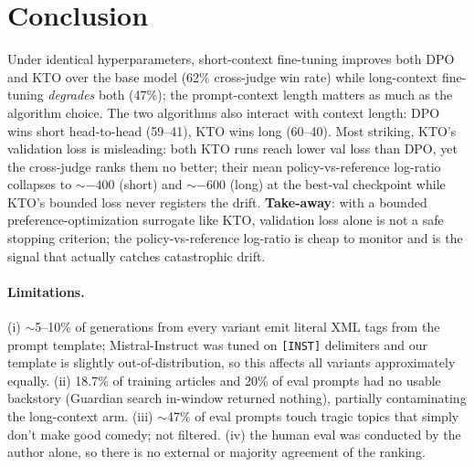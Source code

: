 \section{Conclusion}
\label{sec:conclusion}

\enlargethispage{4\baselineskip}
Under identical hyperparameters, short-context fine-tuning improves both DPO and KTO over the base model (62\% cross-judge win rate) while long-context fine-tuning \emph{degrades} both (47\%); the prompt-context length matters as much as the algorithm choice.  The two algorithms also interact with context length: DPO wins short head-to-head (59--41), KTO wins long (60--40).  Most striking, KTO's validation loss is misleading: both KTO runs reach lower val loss than DPO, yet the cross-judge ranks them no better; their mean policy-vs-reference log-ratio collapses to ${\sim}{-400}$ (short) and ${\sim}{-600}$ (long) at the best-val checkpoint while KTO's bounded loss never registers the drift.  \textbf{Take-away}: with a bounded preference-optimization surrogate like KTO, validation loss alone is not a safe stopping criterion; the policy-vs-reference log-ratio is cheap to monitor and is the signal that actually catches catastrophic drift.

\paragraph{Limitations.}
(i) $\sim$5--10\% of generations from every variant emit literal XML tags from the prompt template; Mistral-Instruct was tuned on \texttt{[INST]} delimiters and our template is slightly out-of-distribution, so this affects all variants approximately equally.
(ii) 18.7\% of training articles and 20\% of eval prompts had no usable backstory (Guardian search in-window returned nothing), partially contaminating the long-context arm.
(iii) $\sim$47\% of eval prompts touch tragic topics that simply don't make good comedy; not filtered.
(iv) the human eval was conducted by the author alone, so there is no external or majority agreement of the ranking.
